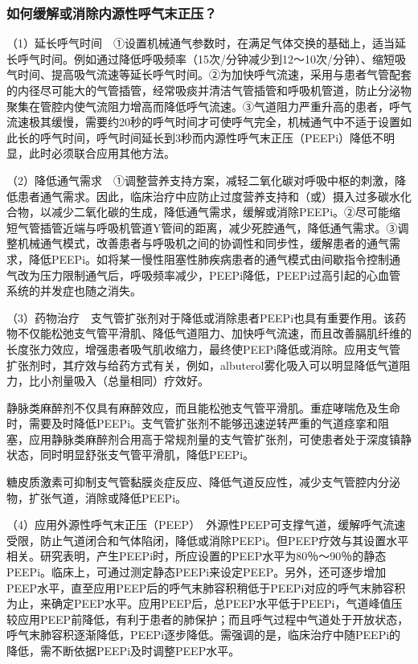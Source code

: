 \subsubsection{如何缓解或消除内源性呼气末正压？}

（1）延长呼气时间　①设置机械通气参数时，在满足气体交换的基础上，适当延长呼气时间。例如通过降低呼吸频率（15次/分钟减少到12～10次/分钟）、缩短吸气时间、提高吸气流速等延长呼气时间。②为加快呼气流速，采用与患者气管配套的内径尽可能大的气管插管，经常吸痰并清洁气管插管和呼吸机管道，防止分泌物聚集在管腔内使气流阻力增高而降低呼气流速。③气道阻力严重升高的患者，呼气流速极其缓慢，需要约20秒的呼气时间才可使呼气完全，机械通气中不适于设置如此长的呼气时间，呼气时间延长到3秒而内源性呼气末正压（PEEPi）降低不明显，此时必须联合应用其他方法。

（2）降低通气需求　①调整营养支持方案，减轻二氧化碳对呼吸中枢的刺激，降低患者通气需求。因此，临床治疗中应防止过度营养支持和（或）摄入过多碳水化合物，以减少二氧化碳的生成，降低通气需求，缓解或消除PEEPi。②尽可能缩短气管插管近端与呼吸机管道Y管间的距离，减少死腔通气，降低通气需求。③调整机械通气模式，改善患者与呼吸机之间的协调性和同步性，缓解患者的通气需求，降低PEEPi。如将某一慢性阻塞性肺疾病患者的通气模式由间歇指令控制通气改为压力限制通气后，呼吸频率减少，PEEPi降低，PEEPi过高引起的心血管系统的并发症也随之消失。

（3）药物治疗　支气管扩张剂对于降低或消除患者PEEPi也具有重要作用。该药物不仅能松弛支气管平滑肌、降低气道阻力、加快呼气流速，而且改善膈肌纤维的长度张力效应，增强患者吸气肌收缩力，最终使PEEPi降低或消除。应用支气管扩张剂时，其疗效与给药方式有关，例如，albuterol雾化吸入可以明显降低气道阻力，比小剂量吸入（总量相同）疗效好。

静脉类麻醉剂不仅具有麻醉效应，而且能松弛支气管平滑肌。重症哮喘危及生命时，需要及时降低PEEPi。支气管扩张剂不能够迅速逆转严重的气道痉挛和阻塞，应用静脉类麻醉剂合用高于常规剂量的支气管扩张剂，可使患者处于深度镇静状态，同时明显舒张支气管平滑肌，降低PEEPi。

糖皮质激素可抑制支气管黏膜炎症反应、降低气道反应性，减少支气管腔内分泌物，扩张气道，消除或降低PEEPi。

（4）应用外源性呼气末正压（PEEP）　外源性PEEP可支撑气道，缓解呼气流速受限，防止气道闭合和气体陷闭，降低或消除PEEPi。但PEEP疗效与其设置水平相关。研究表明，产生PEEPi时，所应设置的PEEP水平为80％～90％的静态PEEPi。临床上，可通过测定静态PEEPi来设定PEEP。另外，还可逐步增加PEEP水平，直至应用PEEP后的呼气末肺容积稍低于PEEPi对应的呼气末肺容积为止，来确定PEEP水平。应用PEEP后，总PEEP水平低于PEEPi，气道峰值压较应用PEEP前降低，有利于患者的肺保护；而且呼气过程中气道处于开放状态，呼气末肺容积逐渐降低，PEEPi逐步降低。需强调的是，临床治疗中随PEEPi的降低，需不断依据PEEPi及时调整PEEP水平。

